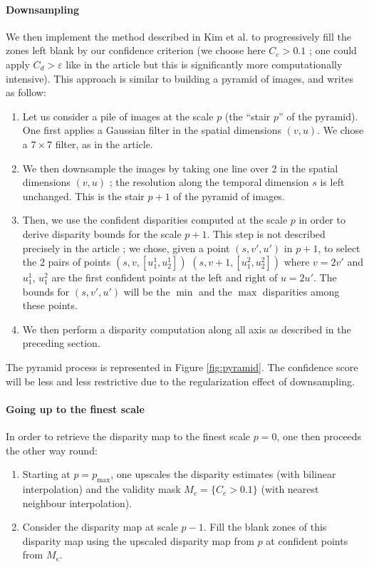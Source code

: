 \documentclass{article}
\theoremstyle{definition}
\begin{document}
\paragraph{Downsampling} We then implement the method described in Kim et al. to progressively fill the zones left blank by our confidence criterion (we choose here $C_e > 0.1$ ; one could apply $C_d > \varepsilon$ like in the article but this is significantly more computationally intensive). This approach is similar to building a pyramid of images, and writes as follow:
\begin{enumerate}
 \item Let us consider a pile of images at the scale $p$ (the ``stair $p$'' of the pyramid). One first applies a Gaussian filter in the spatial dimensions $(v, u)$. We chose a $7\times 7$ filter, as in the article.
 \item We then downsample the images by taking one line over 2 in the spatial dimensions $(v, u)$ ; the resolution along the temporal dimension $s$ is left unchanged. This is the stair $p+1$ of the pyramid of images.
 \item Then, we use the confident disparities computed at the scale $p$ in order to derive disparity bounds for the scale $p+1$. This step is not described precisely in the article ; we chose, given a point $(s, v', u')$ in $p+1$, to select the 2 pairs of points $(s, v, [u_1^1, u_2^1])$ $(s, v+1, [u_1^2, u_2^2])$ where $v = 2 v'$ and $u_1^1$, $u_1^2$ are the first confident points at the left and right of $u=2u'$. The bounds for $(s, v', u')$ will be the $\min$ and the $\max$ disparities among these points.
 \item We then perform a disparity computation along all axis as described in the preceding section.
\end{enumerate}
The pyramid process is represented in Figure \ref{fig:pyramid}. The confidence score will be less and less restrictive due to the regularization effect of downsampling.


\paragraph{Going up to the finest scale} In order to retrieve the disparity map to the finest scale $p=0$, one then proceeds the other way round:
\begin{enumerate}
 \item Starting at $p=p_{\max}$, one upscales the disparity estimates (with bilinear interpolation) and the validity mask $M_e = \{C_e > 0.1\}$ (with nearest neighbour interpolation).
 \item Consider the disparity map at scale $p-1$. Fill the blank zones of this disparity map using the upscaled disparity map from $p$ at confident points from $M_e$.
\end{enumerate}
\end{document}
